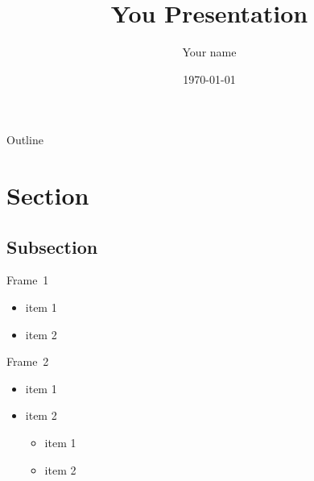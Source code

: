\documentclass[handout]{beamer}
\title{You Presentation}
\author{Your name}
\institute{Your department}
\date{\today} %
\begin{document}
\frame{\titlepage}
\section[Outline]{}
\begin{frame}[allowframebreaks]{Outline}
  \tableofcontents
\end{frame}

\section{Section}
\subsection{Subsection}
\begin{frame}[fragile]{Frame\ 1}
  \begin{itemize}
  	\item item 1
    \item item 2
  \end{itemize}
\end{frame}

\begin{frame}[fragile]{Frame\ 2}
  \begin{itemize}
    \item item 1
    \item item 2
      \begin{itemize}
        \item item 1
        \item item 2
      \end{itemize}
  \end{itemize}
\end{frame}
\end{document}
